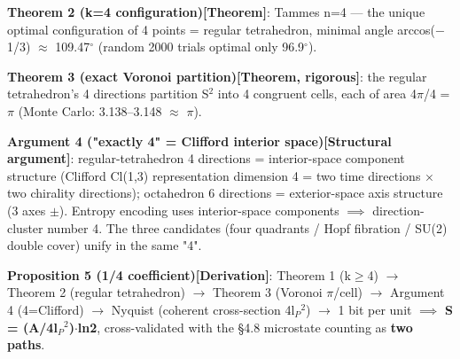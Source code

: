 \documentclass[12pt]{article}
\newcommand{\mtag}[1]{\textbf{[#1]}}
\newcommand{\up}[1]{\ensuremath{^{#1}}}
\newcommand{\down}[1]{\ensuremath{_{#1}}}
\begin{document}
\textbf{Theorem 2 (k=4 configuration)\mtag{Theorem}}: Tammes n=4 --- the unique optimal configuration of 4 points = regular tetrahedron, minimal angle arccos(\ensuremath{-}1/3) \ensuremath{\approx} 109.47\ensuremath{^{\circ}} (random 2000 trials optimal only 96.9\ensuremath{^{\circ}}).

\textbf{Theorem 3 (exact Voronoi partition)\mtag{Theorem, rigorous}}: the regular tetrahedron's 4 directions partition S\up{2} into 4 congruent cells, each of area 4\ensuremath{\pi}/4 = \ensuremath{\pi} (Monte Carlo: 3.138--3.148 \ensuremath{\approx} \ensuremath{\pi}).

\textbf{Argument 4 ("exactly 4" = Clifford interior space)\mtag{Structural argument}}: regular-tetrahedron 4 directions = interior-space component structure (Clifford Cl(1,3) representation dimension 4 = two time directions \ensuremath{\times} two chirality directions); octahedron 6 directions = exterior-space axis structure (3 axes \ensuremath{\pm}). Entropy encoding uses interior-space components \ensuremath{\implies} direction-cluster number 4. The three candidates (four quadrants / Hopf fibration / SU(2) double cover) unify in the same "4".

\textbf{Proposition 5 (1/4 coefficient)\mtag{Derivation}}: Theorem 1 (k\ensuremath{\geq}4) \ensuremath{\to} Theorem 2 (regular tetrahedron) \ensuremath{\to} Theorem 3 (Voronoi \ensuremath{\pi}/cell) \ensuremath{\to} Argument 4 (4=Clifford) \ensuremath{\to} Nyquist (coherent cross-section 4l\down{P}\up{2}) \ensuremath{\to} 1 bit per unit \ensuremath{\implies} \textbf{S = (A/4l\down{P}\up{2})\ensuremath{\cdot}ln2}, cross-validated with the \S{}4.8 microstate counting as \textbf{two paths}.
\end{document}
